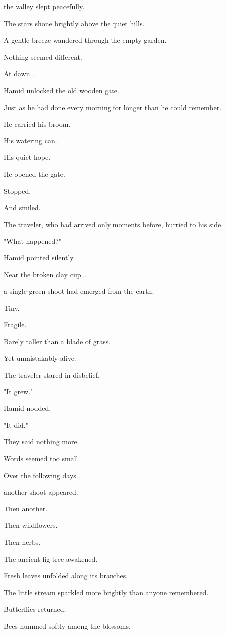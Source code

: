 \documentclass[12pt,openany]{book}
\begin{document}
the valley slept peacefully.

The stars shone brightly above the quiet hills.

A gentle breeze wandered through the empty garden.

Nothing seemed different.

At dawn...

Hamid unlocked the old wooden gate.

Just as he had done every morning for longer than he could remember.

He carried his broom.

His watering can.

His quiet hope.

He opened the gate.

Stopped.

And smiled.

The traveler, who had arrived only moments before, hurried to his side.

"What happened?"

Hamid pointed silently.

Near the broken clay cup...

a single green shoot had emerged from the earth.

Tiny.

Fragile.

Barely taller than a blade of grass.

Yet unmistakably alive.

The traveler stared in disbelief.

"It grew."

Hamid nodded.

"It did."

They said nothing more.

Words seemed too small.

Over the following days...

another shoot appeared.

Then another.

Then wildflowers.

Then herbs.

The ancient fig tree awakened.

Fresh leaves unfolded along its branches.

The little stream sparkled more brightly than anyone remembered.

Butterflies returned.

Bees hummed softly among the blossoms.
\end{document}
